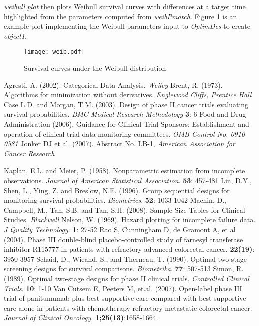 \documentclass[12pt]{article}
\begin{document}
{\it weibull.plot} then plots Weibull survival curves with differences at a target time highlighted from the parameters
computed from {\it weibPmatch}. Figure \ref{weib} is an example plot implementing the Weibull parameters input
to {\it OptimDes} to create {\it object1}.


\begin{figure}[htbp]
\begin{center}
\texttt{[image: weib.pdf]}
\caption{Survival curves under the Weibull distribution} \label{weib}
\end{center}
\end{figure}



\newpage

\begin{thebibliography}{}
 Agresti, A. (2002). Categorical Data Analysis. {\it Weiley}
 Brent, R. (1973). Algorithms for minimization without derivatives. {\it Englewood Cliffs, Prentice Hall}
 Case L.D. and Morgan, T.M. (2003). Design of phase II cancer trials evaluating survival probabilities. {\it BMC Medical Research Methodology} {\bf 3}: 6
 Food and Drug Administration (2006).  Guidance for Clinical Trial Sponsors:  Establishment and operation of clinical trial data monitoring committees.  {\it OMB Control No. 0910-0581}
 Jonker DJ et al. (2007).  Abstract No. LB-1, {\it American Association for Cancer Research}

 Kaplan, E.L. and Meier, P. (1958). Nonparametric estimation from incomplete observations. {\it Journal of American Statistical Association}. {\bf 53}: 457-481
 Lin, D.Y., Shen, L., Ying, Z. and Breslow, N.E. (1996). Group sequential designs for monitoring survival probabilities. {\it Biometrics}. {\bf 52}: 1033-1042
 Machin, D., Campbell, M., Tan, S.B. and Tan, S.H. (2008). Sample Size Tables for
Clinical Studies. {\it Blackwell}
 Nelson, W. (1969). Hazard plotting for incomplete failure data. {\it J Quality Technology}. {\bf 1}: 27-52
 Rao S, Cunningham D, de Gramont A, et al (2004).  Phase III double-blind placebo-controlled study of farnesyl transferase
inhibitor R115777 in patients with refractory advanced colorectal cancer.
{\bf 22(19)}: 3950-3957
 Schaid, D., Wieand, S., and Therneau, T. (1990).  Optimal two-stage screening designs for survival comparisons. {\it Biometrika}.
{\bf 77}: 507-513
 Simon, R. (1989). Optimal two-stage designs for phase II clinical trials. {\it Controlled Clinical Trials}. {\bf 10}: 1-10
 Van Cutsem E, Peeters M, et.al. (2007).  Open-label phase III trial of panitumumab plus best
supportive care compared with best supportive care alone in patients with
chemotherapy-refractory metastatic colorectal cancer. {\it Journal of Clinical Oncology}. {\bf 1;25(13)}:1658-1664.
\end{thebibliography}
\end{document}
